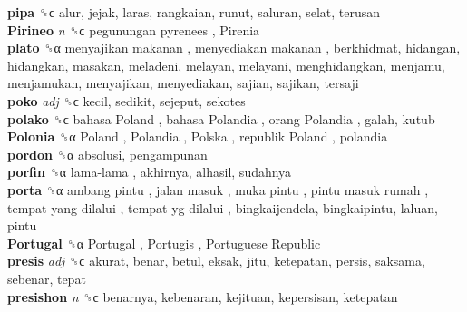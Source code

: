 \textbf{pipa} ␝ϲ  alur, jejak, laras, rangkaian, runut, saluran, selat, terusan  \\
\textbf{Pirineo} \emph{n}  ␝ϲ   pegunungan pyrenees ,  Pirenia   \\
\textbf{plato} ␝α   menyajikan makanan ,  menyediakan makanan , berkhidmat, hidangan, hidangkan, masakan, meladeni, melayan, melayani, menghidangkan, menjamu, menjamukan, menyajikan, menyediakan, sajian, sajikan, tersaji  \\
\textbf{poko} \emph{adj}  ␝ϲ  kecil, sedikit, sejeput, sekotes  \\
\textbf{polako} ␝ϲ   bahasa Poland ,  bahasa Polandia ,  orang Polandia , galah, kutub  \\
\textbf{Polonia} ␝α   Poland ,  Polandia ,  Polska ,  republik Poland , polandia  \\
\textbf{pordon} ␝α  absolusi, pengampunan  \\
\textbf{porfin} ␝α   lama-lama , akhirnya, alhasil, sudahnya  \\
\textbf{porta} ␝α   ambang pintu ,  jalan masuk ,  muka pintu ,  pintu masuk rumah ,  tempat yang dilalui ,  tempat yg dilalui , bingkaijendela, bingkaipintu, laluan, pintu  \\
\textbf{Portugal} ␝α   Portugal ,  Portugis ,  Portuguese Republic   \\
\textbf{presis} \emph{adj}  ␝ϲ  akurat, benar, betul, eksak, jitu, ketepatan, persis, saksama, sebenar, tepat  \\
\textbf{presishon} \emph{n}  ␝ϲ  benarnya, kebenaran, kejituan, kepersisan, ketepatan  \\
